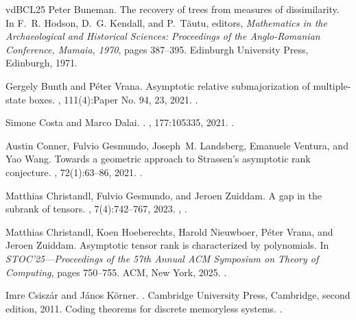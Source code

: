 \documentclass[11pt,letterpaper]{article}
\begin{document}
\begin{thebibliography}{vdBCL{\etalchar{+}}25}
Peter Buneman.
\newblock The recovery of trees from measures of dissimilarity.
\newblock In F.~R. Hodson, D.~G. Kendall, and P.~T{\u{a}}utu, editors, {\em
  Mathematics in the Archaeological and Historical Sciences: Proceedings of the
  Anglo-Romanian Conference, Mamaia, 1970}, pages 387--395. Edinburgh
  University Press, Edinburgh, 1971.

Gergely Bunth and P\'{e}ter Vrana.
\newblock Asymptotic relative submajorization of multiple-state boxes.
, 111(4):Paper No. 94, 23, 2021.
\newblock \href {https://doi.org/10.1007/s11005-021-01430-0}
  {}.

Simone Costa and Marco Dalai.
.
, 177:105335, 2021.
\newblock \href {https://doi.org/10.1016/j.jcta.2020.105335}
  {}.

Austin Conner, Fulvio Gesmundo, Joseph~M. Landsberg, Emanuele Ventura, and Yao
  Wang.
\newblock Towards a geometric approach to {S}trassen's asymptotic rank
  conjecture.
, 72(1):63--86, 2021.
\newblock \href {https://doi.org/10.1007/s13348-020-00280-8}
  {}.

Matthias Christandl, Fulvio Gesmundo, and Jeroen Zuiddam.
\newblock A gap in the subrank of tensors.
, 7(4):742--767, 2023.
\newblock \href {https://arxiv.org/abs/2212.01668} {},
  \href {https://doi.org/10.1137/22M1543276} {}.

Matthias Christandl, Koen Hoeberechts, Harold Nieuwboer, P\'{e}ter Vrana, and
  Jeroen Zuiddam.
\newblock Asymptotic tensor rank is characterized by polynomials.
\newblock In {\em S{TOC}'25---{P}roceedings of the 57th {A}nnual {ACM}
  {S}ymposium on {T}heory of {C}omputing}, pages 750--755. ACM, New York, 2025.
\newblock \href {https://doi.org/10.1145/3717823.3718122}
  {}.

Imre Csisz\'{a}r and J\'{a}nos K\"{o}rner.
.
\newblock Cambridge University Press, Cambridge, second edition, 2011.
\newblock Coding theorems for discrete memoryless systems.
\newblock \href {https://doi.org/10.1017/CBO9780511921889}
  {}.


\end{thebibliography}
\end{document}
